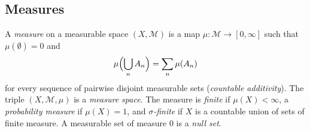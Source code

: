 \begin{notechapter}
\section{Measures}\label{measures:sec:measures}

\begin{definition}[Measure]\label{measures:def:measure}
A \emph{measure} on a measurable space $(X, \mathcal M)$ is a map
$\mu:\mathcal M\to[0, \infty]$ such that $\mu(\emptyset) = 0$ and
\[
  \mu\Bigl(\bigcup_nA_n\Bigr) = \sum_n\mu(A_n)
\]
for every sequence of pairwise disjoint measurable sets
(\emph{countable additivity}). The triple $(X, \mathcal M, \mu)$ is a
\emph{measure space}. The measure is \emph{finite} if $\mu(X) < \infty$,
a \emph{probability measure} if $\mu(X) = 1$, and \emph{$\sigma$-finite}
if $X$ is a countable union of sets of finite measure. A measurable set
of measure $0$ is a \emph{null set}.
\end{definition}


\end{notechapter}
